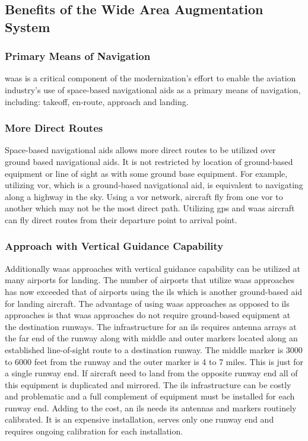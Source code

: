 \subsection{Benefits of the Wide Area Augmentation
System}\label{benefits-of-the-wide-area-augmentation-system}

\subsubsection{Primary Means of
Navigation}\label{primary-means-of-navigation}

\ac{waas} is a critical component of the modernization's effort to enable the
aviation industry's use of space-based navigational aids as a primary
means of navigation, including: takeoff, en-route, approach and landing.

\subsubsection{More Direct Routes}\label{more-direct-routes}

Space-based navigational aids allows more direct routes to be utilized
over ground based navigational aids. It is not restricted by location of
ground-based equipment or line of sight as with some ground base
equipment. For example, utilizing \ac{vor}, which is a ground-based
navigational aid, is equivalent to navigating along a highway in the
sky. Using a \ac{vor} network, aircraft fly from one \ac{vor} to another which may
not be the most direct path. Utilizing \ac{gps} and \ac{waas} aircraft can fly
direct routes from their departure point to arrival point.

\subsubsection{Approach with Vertical Guidance
Capability}\label{approach-with-vertical-guidance-capability}

Additionally \ac{waas} approaches with
vertical guidance capability can be utilized at many airports for
landing. The number of airports that utilize \ac{waas} approaches has now exceeded that of airports using the
\ac{ils} which is another ground-based aid for landing
aircraft. The advantage of using \ac{waas} approaches as opposed to
\ac{ils} approaches is that \ac{waas} approaches do
not require ground-based equipment at the destination runways. The
infrastructure for an \ac{ils} requires antenna
arrays at the far end of the runway along with middle and outer markers
located along an established line-of-sight route to a destination
runway. The middle marker is 3000 to 6000 feet from the runway and the
outer marker is 4 to 7 miles. This is just for a single runway end. If
aircraft need to land from the opposite runway end all of this equipment
is duplicated and mirrored. The \ac{ils} infrastructure can be costly and
problematic and a full complement of equipment must be installed for
each runway end. Adding to the cost, an \ac{ils} needs its antennas and
markers routinely calibrated. It is an expensive installation, serves
only one runway end and requires ongoing calibration for each
installation.

